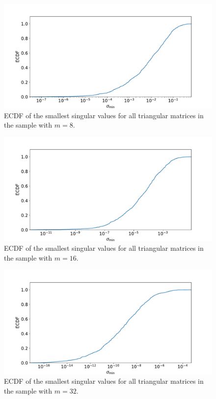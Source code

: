 \documentclass[a4paper, 11pt]{article}
\begin{document}
\begin{figure}
  \centering
  \includegraphics[width=\textwidth]{../2/triangular/ecdf/8.pdf}
  \caption{ECDF of the smallest singular values for all triangular matrices in
  the sample with $m=8$.}
  \label{fig:sigma_min_triangular_ECDF_8}
\end{figure}
\begin{figure}
  \centering
  \includegraphics[width=\textwidth]{../2/triangular/ecdf/16.pdf}
  \caption{ECDF of the smallest singular values for all triangular matrices in
  the sample with $m=16$.}
  \label{fig:sigma_min_triangular_ECDF_16}
\end{figure}
\begin{figure}
  \centering
  \includegraphics[width=\textwidth]{../2/triangular/ecdf/32.pdf}
  \caption{ECDF of the smallest singular values for all triangular matrices in
  the sample with $m=32$.}
  \label{fig:sigma_min_triangular_ECDF_32}
\end{figure}
\end{document}
